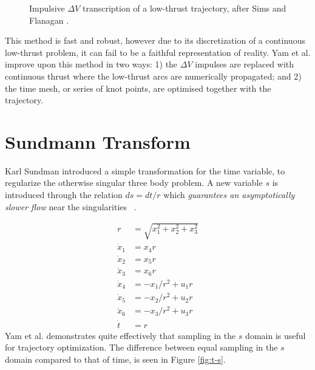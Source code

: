 \begin{figure}[H]
    \centering
    \label{fig:sf}
    \caption{
        Impulsive $\Delta{V}$ transcription of a low-thrust trajectory, after
        Sims and Flanagan \cite{Yam2010}.
    }
\end{figure}

This method is fast and robust, however due to its discretization of a
continuous low-thrust problem, it can fail to be a faithful representation of
reality. Yam et al. improve upon this method in two ways: 1) the $\Delta{V}$
impulses are replaced with continuous thrust where the low-thrust arcs are
numerically propagated; and 2) the time mesh, or series of knot points, are
optimised together with the trajectory.

\section{Sundmann Transform\label{sec:sundmann}}
Karl Sundman introduced a simple transformation for the time variable, to
regularize the otherwise singular three body problem. A new variable $s$ is
introduced through the relation $ds=dt/r$ which \textit{guarantees an
asymptotically slower flow} near the singularities ~\cite{Sundman1913}.

\begin{equation}
    \begin{aligned}
        r&=\sqrt{x_1 ^2 + x_2 ^ 2 + x_3 ^ 2}\\
        \dot{x}_1 &= x_{4}r\\
        \dot{x}_2 &= x_{5}r\\
        \dot{x}_3 &= x_{6}r\\
        \dot{x}_4 &= -x_{1}/r^2+u_1{r}\\
        \dot{x}_5 &= -x_{2}/r^2+u_2{r}\\
        \dot{x}_6 &= -x_{3}/r^2+u_3{r}\\
        \dot{t} &= r
    \end{aligned}
\end{equation}
Yam et al. demonstrates quite effectively that sampling in the $s$ domain is
useful for trajectory optimization. \cite{Yam2010} The difference between equal
sampling in the $s$ domain compared to that of time, is seen in Figure
\ref{fig:t-s}.

